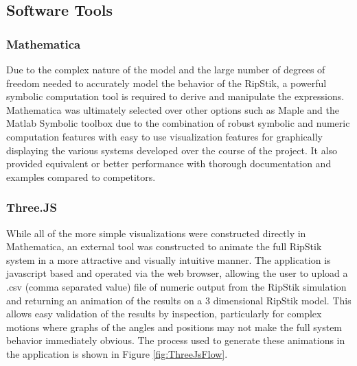 \subsection{Software Tools}
\subsubsection{Mathematica}
Due to the complex nature of the model and the large number of degrees of freedom needed to accurately model the behavior of the RipStik, a powerful symbolic computation tool is required to derive and manipulate the expressions. 
Mathematica was ultimately selected over other options such as Maple and the Matlab Symbolic toolbox due to the combination of robust symbolic and numeric computation features with easy to use visualization features for graphically displaying the various systems developed over the course of the project.
It also provided equivalent or better performance with thorough documentation and examples compared to competitors.
\subsubsection{Three.JS}
While all of the more simple visualizations were constructed directly in Mathematica, an external tool was constructed to animate the full RipStik system in a more attractive and visually intuitive manner. 
The application is javascript based and operated via the web browser, allowing the user to upload a .csv (comma separated value) file of numeric output from the RipStik simulation and returning an animation of the results on a 3 dimensional RipStik model. 
This allows easy validation of the results by inspection, particularly for complex motions where graphs of the angles and positions may not make the full system behavior immediately obvious.
The process used to generate these animations in the application is shown in Figure \ref{fig:ThreeJsFlow}.

